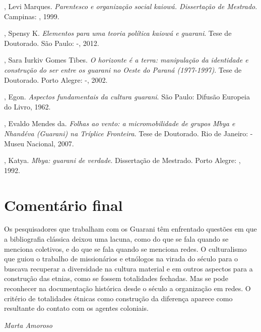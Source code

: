 {{\begin{Parskip}
, Levi Marques. \emph{Parentesco e organização social kaiowá.
Dissertação de Mestrado}. Campinas: , 1999.

, Spensy K. \emph{Elementos para uma teoria política kaiowá e guarani}.
 Tese de Doutorado. São Paulo: -, 2012.

, Sara Iurkiv Gomes Tibes. \emph{O horizonte é a terra: manipulação da
identidade e construção do ser entre os guarani no Oeste do Paraná
(1977-1997)}. Tese de Doutorado. Porto Alegre: -, 2002.

, Egon. \emph{Aspectos fundamentais da cultura guarani}. São Paulo:
Difusão Europeia do Livro, 1962.

, Evaldo Mendes da. \emph{Folhas ao vento: a micromobilidade de grupos
Mbya e Nhandéva (Guarani) na Tríplice Fronteira}. Tese de Doutorado. Rio
de Janeiro: -Museu Nacional, 2007.

, Katya. \emph{Mbya: guarani de verdade}. Dissertação de Mestrado. Porto
Alegre: , 1992.
\end{Parskip}

\section{Comentário final}
Os pesquisadores que trabalham com os Guarani têm enfrentado questões em
que a bibliografia clássica deixou uma lacuna, como do que se fala
quando se menciona coletivos, e do que se fala quando se menciona
redes. O culturalismo que guiou o trabalho de missionários e etnólogos
na virada do século  para o  buscava recuperar a diversidade na
cultura material e em outros aspectos para a construção das etnias,
como se fossem totalidades fechadas. Mas se pode reconhecer na
documentação histórica desde o século  a organização em redes. O
critério de totalidades étnicas como construção da diferença aparece
como resultante do contato com os agentes coloniais.
\medskip
\begin{flushright}
\emph{Marta Amoroso}
\end{flushright}

}}

